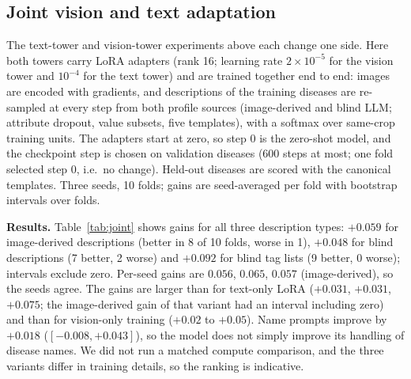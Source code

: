 \documentclass[11pt]{article}
\begin{document}
\subsection{Joint vision and text adaptation}\label{sec:joint}
The text-tower and vision-tower experiments above each change one side. Here both towers carry LoRA adapters (rank 16; learning rate $2\times10^{-5}$ for the vision tower and $10^{-4}$ for the text tower) and are trained together end to end: images are encoded with gradients, and descriptions of the training diseases are re-sampled at every step from both profile sources (image-derived and blind LLM; attribute dropout, value subsets, five templates), with a softmax over same-crop training units. The adapters start at zero, so step 0 is the zero-shot model, and the checkpoint step is chosen on validation diseases (600 steps at most; one fold selected step 0, i.e.\ no change). Held-out diseases are scored with the canonical templates. Three seeds, 10 folds; gains are seed-averaged per fold with bootstrap intervals over folds.

\begin{table}[t]\centering\small
\resizebox{\linewidth}{!}{}
\caption{Joint vision+text LoRA, PlantWild 10-fold CV, unit-macro top-1 (mean of three seeds); in brackets the gain over the same run's zero-shot start with a bootstrap 95\% interval over folds.}\label{tab:joint}
\end{table}

\textbf{Results.} Table~\ref{tab:joint} shows gains for all three description types: $+0.059$ for image-derived descriptions (better in 8 of 10 folds, worse in 1), $+0.048$ for blind descriptions (7 better, 2 worse) and $+0.092$ for blind tag lists (9 better, 0 worse); intervals exclude zero. Per-seed gains are $0.056$, $0.065$, $0.057$ (image-derived), so the seeds agree. The gains are larger than for text-only LoRA ($+0.031$, $+0.031$, $+0.075$; the image-derived gain of that variant had an interval including zero) and than for vision-only training ($+0.02$ to $+0.05$). Name prompts improve by $+0.018$ ($[-0.008, +0.043]$), so the model does not simply improve its handling of disease names. We did not run a matched compute comparison, and the three variants differ in training details, so the ranking is indicative.

\begin{table}[t]\centering\small
\resizebox{\linewidth}{!}{}
\caption{Joint model on the large DigiGreen test (423 images, 39 types, blind profiles), trained on PlantWild diseases that do not match a DigiGreen type (400 steps, final step, three seeds); gain with bootstrap interval over types.}\label{tab:jointdg}
\end{table}
\end{document}
